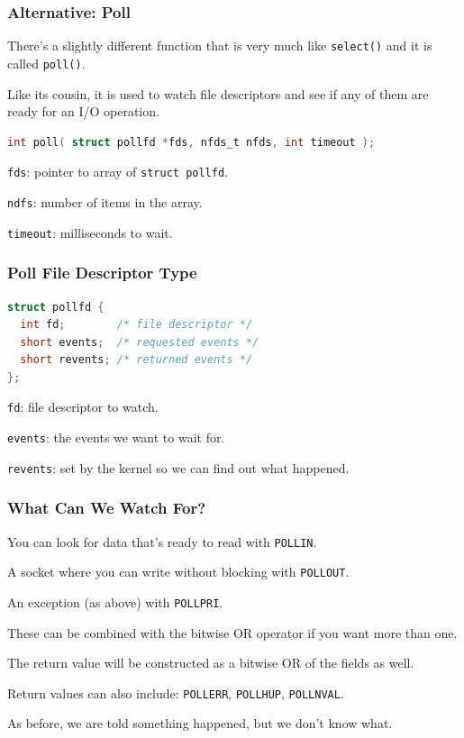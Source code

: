 \begin{frame}[fragile]
	\frametitle{Alternative: Poll}

	There's a slightly different function that is very much like \texttt{select()} and it is called \texttt{poll()}.

	Like its cousin, it is used to watch file descriptors and see if any of them are ready for an I/O operation.

	\begin{lstlisting}[language=C]
int poll( struct pollfd *fds, nfds_t nfds, int timeout );
\end{lstlisting}

	\texttt{fds}: pointer to array of  \texttt{struct pollfd}.

	\texttt{ndfs}: number of items in the array.

	\texttt{timeout}: milliseconds to wait.

\end{frame}

\begin{frame}[fragile]
	\frametitle{Poll File Descriptor Type}

	\begin{lstlisting}[language=C]
struct pollfd {
  int fd;        /* file descriptor */
  short events;  /* requested events */
  short revents; /* returned events */
};
\end{lstlisting}

	\texttt{fd}: file descriptor to watch.

	\texttt{events}: the events we want to wait for.

	\texttt{revents}: set by the kernel so we can find out what happened.

\end{frame}

\begin{frame}
	\frametitle{What Can We Watch For?}

	You can look for data that's ready to read with \texttt{POLLIN}.

	A socket where you can write without blocking with \texttt{POLLOUT}.

	An exception (as above) with \texttt{POLLPRI}.

	These can be combined with the bitwise OR operator if you want more than one.

	The return value will be constructed as a bitwise OR of the fields as well.

	Return values can also include: \texttt{POLLERR}, \texttt{POLLHUP}, \texttt{POLLNVAL}.

	As before, we are told something happened, but we don't know what.

\end{frame}


